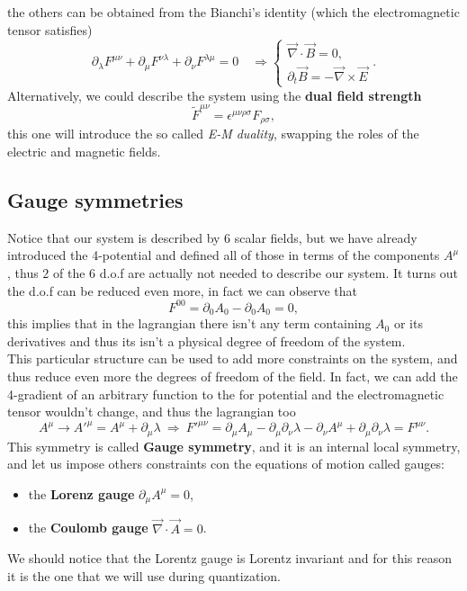 the others can be obtained from the Bianchi's identity (which the electromagnetic tensor satisfies)
\begin{equation*}
    \partial_\lambda F^{\mu\nu}+ \partial_\mu F^{\nu\lambda}+
    \partial_\nu F^{\lambda\mu}=0\quad \Rightarrow\begin{cases}
        \vec \nabla\cdot\vec B=0,\\\partial_{t}\vec B=-\vec\nabla\times\vec E
    \end{cases}.
\end{equation*} 
Alternatively, we could describe the system using the \textbf{dual field strength}
\begin{equation*}
    \tilde F^{\mu\nu}=\epsilon^{\mu\nu\rho\sigma}F_{\rho\sigma},
\end{equation*}
this one will introduce the so called \emph{E-M duality}, swapping the roles of the electric and magnetic fields.
\subsection{Gauge symmetries}
Notice that our system is described by $6$ scalar fields, but we have already introduced the 4-potential and defined all of those in terms of the components $A^\mu$, thus $2$ of the $6$ d.o.f are actually not needed to describe our system. It turns out the d.o.f can be reduced even more, in fact we can observe that 
\begin{equation*}
    F^{00}=\partial_{0}A_0-\partial_0 A_0=0,
\end{equation*}
this implies that in the lagrangian there isn't any term containing $A_0$ or its derivatives and thus its isn't a physical degree of freedom of the system. \\

This particular structure can be used to add more constraints on the system, and thus reduce even more the degrees of freedom of the field. In fact, we can add the 4-gradient of an arbitrary function to the for potential and the electromagnetic tensor wouldn't change, and thus the lagrangian too
\begin{equation*}
    A^\mu\rightarrow A'^\mu= A^\mu+\partial_\mu\lambda\ \Rightarrow\ F'^{\mu\nu}=\partial_\mu A_\mu -\partial_\mu\partial_\nu\lambda-\partial_\nu A^\mu+\partial_\mu\partial_\nu\lambda=F^{\mu\nu}.
\end{equation*} 
This symmetry is called \textbf{Gauge symmetry}, and it is an internal local symmetry, and let us impose others constraints con the equations of motion called gauges:
\begin{itemize}
    \item the \textbf{Lorenz gauge} $\partial_\mu A^\mu=0$,
    \item the \textbf{Coulomb gauge} $\vec \nabla\cdot\vec A=0$.
\end{itemize}
We should notice that the Lorentz gauge is Lorentz invariant and for this reason it is the one that we will use during quantization.
